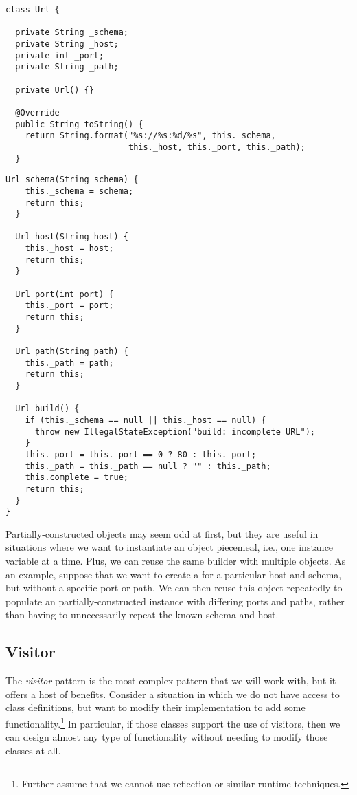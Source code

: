 \enlargethispage{1\baselineskip}
\begin{lstlisting}[language=MyJava]
class Url {

  private String _schema;
  private String _host;
  private int _port;
  private String _path;
  
  private Url() {}

  @Override
  public String toString() {
    return String.format("%s://%s:%d/%s", this._schema,
                         this._host, this._port, this._path);
  }
\end{lstlisting}
\newpage
\begin{lstlisting}[language=MyJava]
  Url schema(String schema) {
    this._schema = schema;
    return this;
  }

  Url host(String host) {
    this._host = host;
    return this;
  }

  Url port(int port) {
    this._port = port;
    return this;
  }

  Url path(String path) {
    this._path = path;
    return this;
  }

  Url build() {
    if (this._schema == null || this._host == null) {
      throw new IllegalStateException("build: incomplete URL");
    }
    this._port = this._port == 0 ? 80 : this._port;
    this._path = this._path == null ? "" : this._path;
    this.complete = true;
    return this;
  }
}
\end{lstlisting}

Partially-constructed objects may seem odd at first, but they are useful in situations where we want to instantiate an object piecemeal, i.e., one instance variable at a time. 
Plus, we can reuse the same builder with multiple objects. 
As an example, suppose that we want to create a  for a particular host and schema, but without a specific port or path. 
We can then reuse this object repeatedly to populate an partially-constructed instance with differing ports and paths, rather than having to unnecessarily repeat the known schema and host.

\subsection{Visitor}

The \emph{visitor} pattern is the most complex pattern that we will work with, but it offers a host of benefits. 
Consider a situation in which we do not have access to class definitions, but want to modify their implementation to add some functionality.\footnote{Further assume that we cannot use reflection or similar runtime techniques.} 
In particular, if those classes support the use of visitors, then we can design almost any type of functionality without needing to modify those classes at all.

